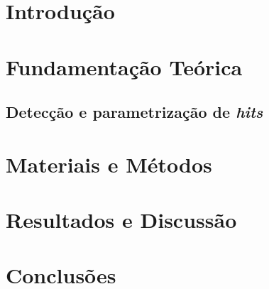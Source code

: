 \documentclass[
	12pt,				%
	oneside,
	a4paper,			%
	english,			%
	french,				%
	spanish,			%
	brazil				%
	]{abntex2}
\begin{document}
\tableofcontents*
\cleardoublepage



\textual

\chapter{Introdução}
\label{chap:introducao}


\chapter{Fundamentação Teórica}
\label{chap:fundamentacao}


\section{Detecção e parametrização de \textit{hits}}
\label{sec:fund_hits}






\chapter{Materiais e Métodos}
\label{chap:metodos}


\chapter{Resultados e Discussão}
\label{chap:resultados}


\chapter{Conclusões}
\label{chap:conclusoes}



\postextual
\end{document}
